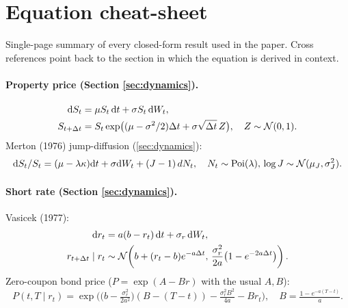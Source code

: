 \section{Equation cheat-sheet}\label{app:cheatsheet}

Single-page summary of every closed-form result used in the paper. Cross
references point back to the section in which the equation is derived in
context.

\paragraph{Property price (Section \ref{sec:dynamics}).}
\begin{align*}
\mathrm{d}S_t &= \mu S_t\,\mathrm{d}t + \sigma S_t\, \mathrm{d}W_t, \\
S_{t+\Delta t} &= S_t \exp\bigl((\mu - \sigma^2/2)\Delta t + \sigma\sqrt{\Delta t}\, Z\bigr),\quad Z\sim\mathcal{N}(0,1).
\end{align*}
Merton (1976) jump-diffusion (\cref{sec:dynamics}):
\begin{equation*}
\mathrm{d}S_t / S_t = (\mu - \lambda \kappa)\mathrm{d}t + \sigma \mathrm{d}W_t + (J - 1)\, dN_t,
\quad N_t \sim \mathrm{Poi}(\lambda),\, \log J \sim \mathcal{N}(\mu_J, \sigma_J^2).
\end{equation*}

\paragraph{Short rate (Section \ref{sec:dynamics}).}
Vasicek (1977):
\begin{align*}
\mathrm{d}r_t &= a(b - r_t)\, \mathrm{d}t + \sigma_r\, \mathrm{d}W_t, \\
r_{t+\Delta t} \mid r_t &\sim \mathcal{N}\!\left( b + (r_t - b)e^{-a\Delta t},\, \frac{\sigma_r^2}{2a}\bigl(1 - e^{-2a\Delta t}\bigr) \right).
\end{align*}
Zero-coupon bond price ($P = \exp(A - B r)$ with the usual $A, B$):
\begin{equation*}
P(t, T \mid r_t) = \exp\!\Big(\Big(b - \tfrac{\sigma_r^2}{2 a^2}\Big)(B - (T - t)) - \tfrac{\sigma_r^2 B^2}{4a} - B r_t\Big),
\quad B = \tfrac{1 - e^{-a(T - t)}}{a}.
\end{equation*}

